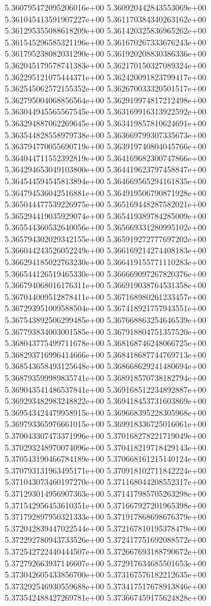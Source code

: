 5.360795472095206016e+00
5.360920442843553069e+00
5.361045413591907227e+00
5.361170384340263162e+00
5.361295355088618209e+00
5.361420325836965262e+00
5.361545296585321196e+00
5.361670267333676243e+00
5.361795238082031290e+00
5.361920208830386336e+00
5.362045179578741383e+00
5.362170150327089324e+00
5.362295121075444371e+00
5.362420091823799417e+00
5.362545062572155352e+00
5.362670033320501517e+00
5.362795004068856564e+00
5.362919974817212498e+00
5.363044945565567545e+00
5.363169916313922592e+00
5.363294887062269645e+00
5.363419857810624691e+00
5.363544828558979738e+00
5.363669799307335673e+00
5.363794770055690719e+00
5.363919740804045766e+00
5.364044711552392819e+00
5.364169682300747866e+00
5.364294653049103800e+00
5.364419623797458847e+00
5.364544594545813894e+00
5.364669565294161835e+00
5.364794536042516881e+00
5.364919506790871928e+00
5.365044477539226975e+00
5.365169448287582021e+00
5.365294419035929074e+00
5.365419389784285009e+00
5.365544360532640056e+00
5.365669331280995102e+00
5.365794302029342155e+00
5.365919272777697202e+00
5.366044243526052249e+00
5.366169214274408183e+00
5.366294185022763230e+00
5.366419155771110283e+00
5.366544126519465330e+00
5.366669097267820376e+00
5.366794068016176311e+00
5.366919038764531358e+00
5.367044009512878411e+00
5.367168980261233457e+00
5.367293951009588504e+00
5.367418921757943551e+00
5.367543892506299485e+00
5.367668863254646539e+00
5.367793834003001585e+00
5.367918804751357520e+00
5.368043775499711678e+00
5.368168746248066725e+00
5.368293716996414666e+00
5.368418687744769713e+00
5.368543658493125648e+00
5.368668629241480694e+00
5.368793599989835741e+00
5.368918570738182794e+00
5.369043541486537841e+00
5.369168512234892887e+00
5.369293482983248822e+00
5.369418453731603869e+00
5.369543424479958915e+00
5.369668395228305968e+00
5.369793365976661015e+00
5.369918336725016061e+00
5.370043307473371996e+00
5.370168278221719049e+00
5.370293248970074096e+00
5.370418219718429143e+00
5.370543190466784189e+00
5.370668161215140124e+00
5.370793131963495171e+00
5.370918102711842224e+00
5.371043073460197270e+00
5.371168044208552317e+00
5.371293014956907363e+00
5.371417985705263298e+00
5.371542956453610351e+00
5.371667927201965398e+00
5.371792897950321333e+00
5.371917868698676379e+00
5.372042839447022544e+00
5.372167810195378479e+00
5.372292780943733526e+00
5.372417751692088572e+00
5.372542722440444507e+00
5.372667693188790672e+00
5.372792663937146607e+00
5.372917634685501653e+00
5.373042605433856700e+00
5.373167576182212635e+00
5.373292546930559688e+00
5.373417517678913846e+00
5.373542488427269781e+00
5.373667459175624828e+00
